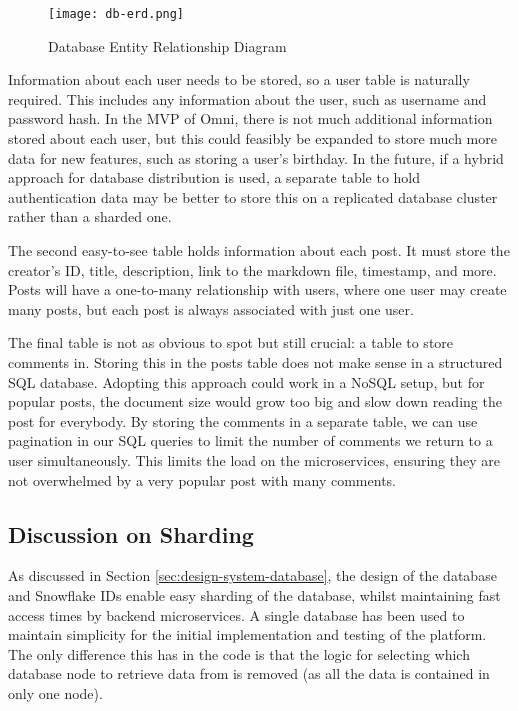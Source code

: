 \begin{figure}[htbp]
\texttt{[image: db-erd.png]}
\centering
\caption{Database Entity Relationship Diagram}
\label{fig:db-erd}
\end{figure}

Information about each user needs to be stored, so a user table is naturally required. This includes any information about the user, such as username and password hash.
In the MVP of Omni, there is not much additional information stored about each user, but this could feasibly be expanded to store much more data for new features, such as storing a user's birthday.
In the future, if a hybrid approach for database distribution is used, a separate table to hold authentication data may be better to store this on a replicated database cluster rather than a sharded one.

The second easy-to-see table holds information about each post. It must store the creator's ID, title, description, link to the markdown file, timestamp, and more.
Posts will have a one-to-many relationship with users, where one user may create many posts, but each post is always associated with just one user. 

The final table is not as obvious to spot but still crucial: a table to store comments in. Storing this in the posts table does not make sense in a structured SQL database.
Adopting this approach could work in a NoSQL setup, but for popular posts, the document size would grow too big and slow down reading the post for everybody.
By storing the comments in a separate table, we can use pagination in our SQL queries to limit the number of comments we return to a user simultaneously.
This limits the load on the microservices, ensuring they are not overwhelmed by a very popular post with many comments.

\subsection{Discussion on Sharding}
As discussed in Section \ref{sec:design-system-database}, the design of the database and Snowflake IDs enable easy sharding of the database, whilst maintaining fast access times by backend microservices.
A single database has been used to maintain simplicity for the initial implementation and testing of the platform. The only difference this has in the code is that the logic for selecting which database node to retrieve data from is removed (as all the data is contained in only one node).


